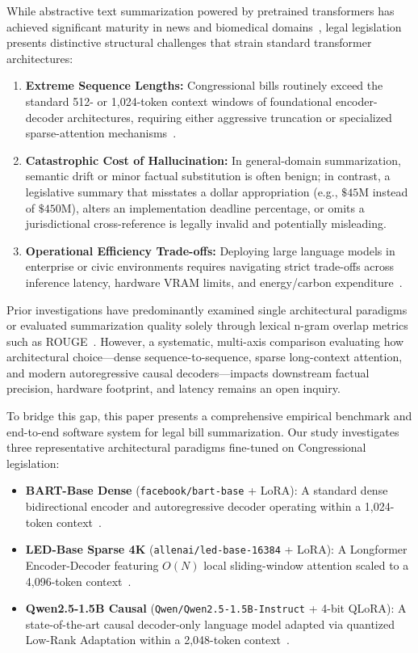 \documentclass[conference]{IEEEtran}
\begin{document}
While abstractive text summarization powered by pretrained transformers has achieved significant maturity in news and biomedical domains~\cite{lewis2020bart,zhang2020pegasus}, legal legislation presents distinctive structural challenges that strain standard transformer architectures:
\begin{enumerate}
    \item \textbf{Extreme Sequence Lengths:} Congressional bills routinely exceed the standard 512- or 1,024-token context windows of foundational encoder-decoder architectures, requiring either aggressive truncation or specialized sparse-attention mechanisms~\cite{beltagy2020longformer}.
    \item \textbf{Catastrophic Cost of Hallucination:} In general-domain summarization, semantic drift or minor factual substitution is often benign; in contrast, a legislative summary that misstates a dollar appropriation (e.g., $\$45\text{M}$ instead of $\$450\text{M}$), alters an implementation deadline percentage, or omits a jurisdictional cross-reference is legally invalid and potentially misleading.
    \item \textbf{Operational Efficiency Trade-offs:} Deploying large language models in enterprise or civic environments requires navigating strict trade-offs across inference latency, hardware VRAM limits, and energy/carbon expenditure~\cite{lacoste2019quantifying,strubell2019energy}.
\end{enumerate}

Prior investigations have predominantly examined single architectural paradigms or evaluated summarization quality solely through lexical n-gram overlap metrics such as ROUGE~\cite{lin2004rouge}. However, a systematic, multi-axis comparison evaluating how architectural choice---dense sequence-to-sequence, sparse long-context attention, and modern autoregressive causal decoders---impacts downstream factual precision, hardware footprint, and latency remains an open inquiry.

To bridge this gap, this paper presents a comprehensive empirical benchmark and end-to-end software system for legal bill summarization. Our study investigates three representative architectural paradigms fine-tuned on Congressional legislation:
\begin{itemize}
    \item \textbf{BART-Base Dense} (\texttt{facebook/bart-base} + LoRA): A standard dense bidirectional encoder and autoregressive decoder operating within a 1,024-token context~\cite{lewis2020bart}.
    \item \textbf{LED-Base Sparse 4K} (\texttt{allenai/led-base-16384} + LoRA): A Longformer Encoder-Decoder featuring $O(N)$ local sliding-window attention scaled to a 4,096-token context~\cite{beltagy2020longformer}.
    \item \textbf{Qwen2.5-1.5B Causal} (\texttt{Qwen/\allowbreak Qwen2.5-\allowbreak 1.5B-\allowbreak Instruct} + 4-bit QLoRA): A state-of-the-art causal decoder-only language model adapted via quantized Low-Rank Adaptation within a 2,048-token context~\cite{dettmers2023qlora,qwen2024}.
\end{itemize}
\end{document}
